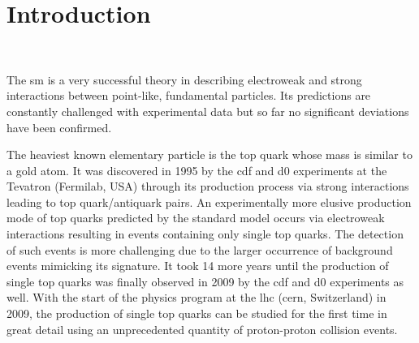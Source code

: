 \chapter*{Introduction}


\hfill\parbox[t][1.4cm][t]{0.47\textwidth}{\vspace{-1.9cm}
\small{}\\[0.3\baselineskip]
}

The \acrlong{sm} is a very successful theory in describing electroweak and strong interactions between point-like, fundamental particles. Its predictions are constantly challenged with experimental data but so far no significant deviations have been confirmed. 

The heaviest known elementary particle is the top quark whose mass is similar to a gold atom. It was discovered in 1995 by the \gls{cdf} and \gls{d0} experiments at the Tevatron (Fermilab, USA) through its production process via strong interactions leading to top quark/antiquark pairs. An experimentally more elusive production mode of top quarks predicted by the standard model occurs via electroweak interactions resulting in events containing only single top quarks. The detection of such events is more challenging due to the larger occurrence of background events mimicking its signature. It took 14 more years until the production of single top quarks was finally observed in 2009 by the \gls{cdf} and \gls{d0} experiments as well. With the start of the physics program at the \gls{lhc} (\gls{cern}, Switzerland) in 2009, the production of single top quarks can be studied for the first time in great detail using an unprecedented quantity of proton-proton collision events.

